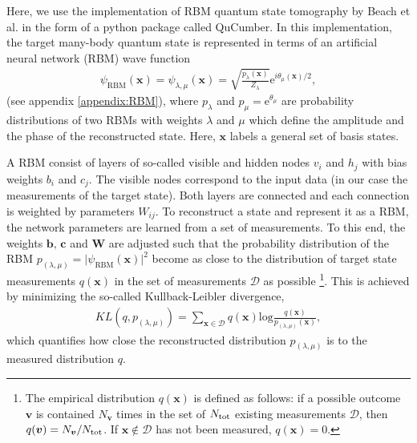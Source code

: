 \documentclass[pra,aps,showpacs,groupedaddress,superscriptaddress,twocolumn,toc=flat,biblatex,footinbib]{revtex4-1}
\renewcommand{\vec}[1]{\bm{#1}}
\begin{document}
Here, we use the implementation of RBM quantum state tomography by Beach et al. \cite{Beach2019} in the form of a python package called QuCumber. In this implementation, the target many-body quantum state is represented in terms of an artificial neural network (RBM) wave function
\begin{align}
\psi_{\mathrm{RBM}}(\vec{x})=\psi_{\lambda, \mu}(\vec{x}) = \sqrt{\frac{p_\lambda(\vec{x})}{Z_\lambda}}\mathrm{e}^{i\theta_\mu(\vec{x})/2},
\label{eq:RBMstate}
\end{align}
(see appendix \ref{appendix:RBM}), where $p_\lambda$ and $p_{\mu}=\mathrm{e}^{ \theta _{\mu}}$ are probability distributions of two RBMs with weights $\lambda$ and $\mu$ which define the amplitude and the phase of the reconstructed state. Here, $\vec{x}$ labels a general set of basis states. 

A RBM consist of layers of so-called visible and hidden nodes $v_i$ and $h_j$ with bias weights $b_i$ and $c_j$. The visible nodes correspond to the input data (in our case the measurements of the target state). Both layers are connected and each connection is weighted by parameters $W_{ij}$. To reconstruct a state and represent it as a RBM, the network parameters are learned from a set of measurements. To this end, the weights $\vec{b}, \,\vec{c}$ and $\vec{W}$ are adjusted such that the probability distribution of the RBM $p_{(\lambda, \mu)}=\vert \psi_{\mathrm{RBM}}(\vec{x})\vert ^2$ become as close to the distribution of target state measurements $q(\vec{x})$ in the set of measurements $\mathcal{D}$ as possible \footnote{The empirical distribution $q(\vec{x})$ is defined as follows: if a possible outcome $\vec{v}$ is contained $N_{\vec{v}}$ times in the set of $N_{\rm tot}$ existing measurements $\mathcal{D}$, then $q(\vec{v}) = N_{\vec{v}}/N_{\rm tot}$. If $\vec{x} \notin \mathcal{D}$ has not been measured, $q(\vec{x})=0$.}. This is achieved by minimizing the so-called Kullback-Leibler divergence,
\begin{align}
KL(q, p_{(\lambda, \mu)}) = \sum_{\vec{x} \in \mathcal{D}}q(\vec{x})\mathrm{log}\frac{q(\vec{x})}{p_{(\lambda, \mu)}(\vec{x})},
\label{eq:KL}
\end{align}
which quantifies how close the reconstructed distribution $p_{(\lambda, \mu)}$ is to the measured distribution $q$.
\end{document}
